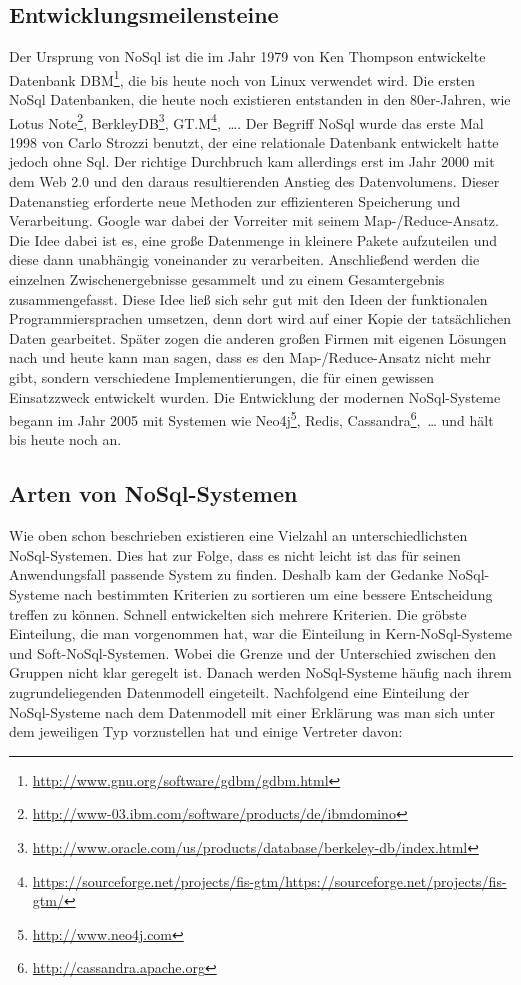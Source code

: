 \subsection{Entwicklungsmeilensteine}
Der Ursprung von NoSql ist die im Jahr 1979 von Ken Thompson entwickelte
Datenbank DBM\footnote{\url{http://www.gnu.org/software/gdbm/gdbm.html}}, die
bis heute noch von Linux verwendet wird. Die ersten NoSql Datenbanken, die
heute noch existieren entstanden in den 80er-Jahren, wie
Lotus Note\footnote{\url{http://www-03.ibm.com/software/products/de/ibmdomino}},
BerkleyDB\footnote{\url{http://www.oracle.com/us/products/database/berkeley-db/index.html}},
GT.M\footnote{\url{https://sourceforge.net/projects/fis-gtm/https://sourceforge.net/projects/fis-gtm/}},~\dots .
Der Begriff NoSql wurde das erste Mal 1998 von Carlo Strozzi benutzt, der eine
relationale Datenbank entwickelt hatte jedoch ohne Sql. Der richtige Durchbruch
kam allerdings erst im Jahr 2000 mit dem Web 2.0 und den daraus resultierenden
Anstieg des Datenvolumens. Dieser Datenanstieg erforderte neue Methoden zur
effizienteren Speicherung und Verarbeitung. Google war dabei der Vorreiter mit
seinem Map-/Reduce-Ansatz. Die Idee dabei ist es, eine große Datenmenge in
kleinere Pakete aufzuteilen und diese dann unabhängig voneinander zu verarbeiten.
Anschließend werden die einzelnen Zwischenergebnisse gesammelt und zu einem
Gesamtergebnis zusammengefasst. Diese Idee ließ sich sehr gut mit den Ideen
der funktionalen Programmiersprachen umsetzen, denn dort wird auf einer Kopie
der tatsächlichen Daten gearbeitet. Später zogen die anderen großen Firmen mit
eigenen Lösungen nach und heute kann man sagen, dass es den Map-/Reduce-Ansatz
nicht mehr gibt, sondern verschiedene Implementierungen, die für einen gewissen
Einsatzzweck entwickelt wurden. Die Entwicklung der modernen NoSql-Systeme
begann im Jahr 2005 mit Systemen wie Neo4j\footnote{\url{http://www.neo4j.com}},
Redis, Cassandra\footnote{\url{http://cassandra.apache.org}},~\dots{} und hält bis
heute noch an.

\subsection{Arten von NoSql-Systemen}
Wie oben schon beschrieben existieren eine Vielzahl an unterschiedlichsten
NoSql-Systemen. Dies hat zur Folge, dass es nicht leicht ist das für seinen
Anwendungsfall passende System zu finden. Deshalb kam der Gedanke NoSql-Systeme
nach bestimmten Kriterien zu sortieren um eine bessere Entscheidung treffen zu
können. Schnell entwickelten sich mehrere Kriterien. Die gröbste Einteilung,
die man vorgenommen hat, war die Einteilung in Kern-NoSql-Systeme und
Soft-NoSql-Systemen. Wobei die Grenze und der Unterschied zwischen den Gruppen
nicht klar geregelt ist. Danach werden NoSql-Systeme häufig nach ihrem
zugrundeliegenden Datenmodell eingeteilt. Nachfolgend eine Einteilung der
NoSql-Systeme nach dem Datenmodell mit einer Erklärung was man sich unter dem
jeweiligen Typ vorzustellen hat und einige Vertreter davon:

